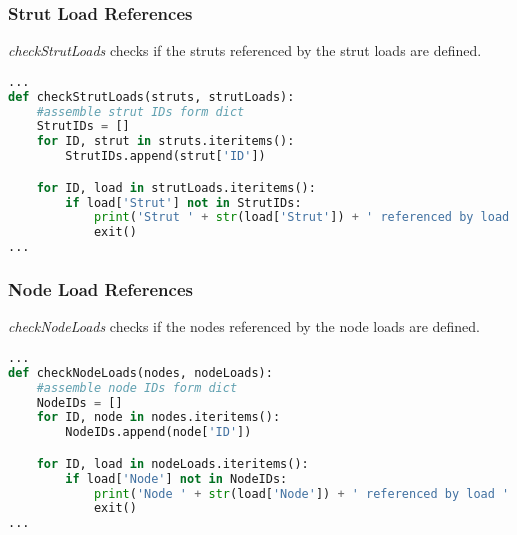 \subsubsection{Strut Load References}
\label{sec:inputcheck-checkStrutLoads}

\textit{checkStrutLoads} checks if the struts referenced by the strut loads are defined.

\begin{inconsolata}
\begin{minipage}{\linewidth}
\begin{lstlisting}[language=python]
...
def checkStrutLoads(struts, strutLoads):
    #assemble strut IDs form dict
    StrutIDs = []
    for ID, strut in struts.iteritems():
        StrutIDs.append(strut['ID'])

    for ID, load in strutLoads.iteritems():
        if load['Strut'] not in StrutIDs:
            print('Strut ' + str(load['Strut']) + ' referenced by load ' + str(ID) + ' but not defined.')
            exit()
...
\end{lstlisting}
\end{minipage}
\end{inconsolata}

\subsubsection{Node Load References}
\label{sec:inputcheck-checkNodeLoads}

\textit{checkNodeLoads} checks if the nodes referenced by the node loads are defined.

\begin{inconsolata}
\begin{minipage}{\linewidth}
\begin{lstlisting}[language=python]
...
def checkNodeLoads(nodes, nodeLoads):
    #assemble node IDs form dict
    NodeIDs = []
    for ID, node in nodes.iteritems():
        NodeIDs.append(node['ID'])

    for ID, load in nodeLoads.iteritems():
        if load['Node'] not in NodeIDs:
            print('Node ' + str(load['Node']) + ' referenced by load ' + str(ID) + ' but not defined.')
            exit()
...
\end{lstlisting}
\end{minipage}
\end{inconsolata}

